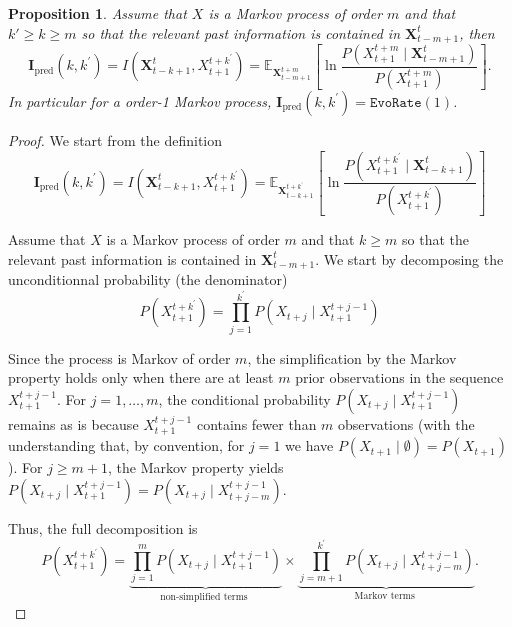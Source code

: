 \documentclass{article}
\newtheorem{proposition}[theorem]{Proposition}
\begin{document}
\begin{proposition}\label{prop:value_of_evoPred_for_markovian_process}
Assume that $X$ is a Markov process of order $m$ and that $k'\geq k \geq m$ so that the relevant past information is contained in $\mathbf{X}_{t-m+1}^t$, then 
$$\mathbf{I}_{\text{pred}}\left(k, k^{\prime}\right)=I\left(\mathbf{X}_{t-k+1}^t, X_{t+1}^{t+k^{\prime}}\right)=\mathbb{E}_{\mathbf{X}_{t-m+1}^{t+m}}\left[\ln \frac{P\left(X_{t+1}^{t+m} \mid \mathbf{X}_{t-m+1}^t\right)}{P\left(X_{t+1}^{t+m}\right)}\right].$$
In particular for a order-1 Markov process, $\mathbf{I}_{\text{pred}}\left(k, k^{\prime}\right) = \texttt{EvoRate}(1)$.
\end{proposition}
\begin{proof}

We start from the definition 
$$
\mathbf{I}_{\text{pred}}\left(k, k^{\prime}\right)=I\left(\mathbf{X}_{t-k+1}^t, X_{t+1}^{t+k^{\prime}}\right)=\mathbb{E}_{\mathbf{X}_{t-k+1}^{t+k^{\prime}}}\left[\ln \frac{P\left(X_{t+1}^{t+k^{\prime}} \mid \mathbf{X}_{t-k+1}^t\right)}{P\left(X_{t+1}^{t+k^{\prime}}\right)}\right]
$$

Assume that $X$ is a Markov process of order $m$ and that $k \geq m$ so that the relevant past information is contained in $\mathbf{X}_{t-m+1}^t$. We start by decomposing the unconditionnal probability (the denominator)
$$
P\left(X_{t+1}^{t+k^{\prime}}\right)=\prod_{j=1}^{k^{\prime}} P\left(X_{t+j} \mid X_{t+1}^{t+j-1}\right)
$$

Since the process is Markov of order $m$, the simplification by the Markov property holds only when there are at least $m$ prior observations in the sequence $X_{t+1}^{t+j-1}$. For $j=1, \ldots, m$, the conditional probability $P\left(X_{t+j} \mid X_{t+1}^{t+j-1}\right)$ remains as is because $X_{t+1}^{t+j-1}$ contains fewer than $m$ observations (with the understanding that, by convention, for $j=1$ we have $P\left(X_{t+1} \mid \emptyset\right)=P\left(X_{t+1}\right)$ ). For $j \geq m+1$, the Markov property yields $P\left(X_{t+j} \mid X_{t+1}^{t+j-1}\right)=P\left(X_{t+j} \mid X_{t+j-m}^{t+j-1}\right) .$


Thus, the full decomposition is
\begin{equation}\label{eq:denominator_term_simplification}
P\left(X_{t+1}^{t+k^{\prime}}\right)=\underbrace{\prod_{j=1}^m P\left(X_{t+j} \mid X_{t+1}^{t+j-1}\right)}_{\text {non-simplified terms }} \times \underbrace{\prod_{j=m+1}^{k^{\prime}} P\left(X_{t+j} \mid X_{t+j-m}^{t+j-1}\right)}_{\text {Markov terms }} .
\end{equation}


\end{proof}
\end{document}

